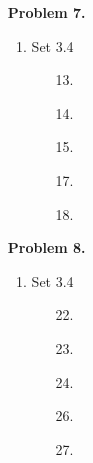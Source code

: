 \documentclass[letterpaper,fleqn]{article}
\begin{document}
\begin{enumerate}
		\item [] \textbf{Problem 7.}
		\begin{enumerate}[]
			\item Set 3.4
			\begin{enumerate}
				\item [13.]
				\item [14.]
				\item [15.]
				\item [17.]
				\item [18.]
			\end{enumerate}
		\end{enumerate}
		
		\item [] \textbf{Problem 8.}
		\begin{enumerate}[]
			\item Set 3.4
			\begin{enumerate}
				\item [22.]
				\item [23.]
				\item [24.]
				\item [26.]
				\item [27.]
			\end{enumerate}
		\end{enumerate}
	\end{enumerate}
\end{document}
